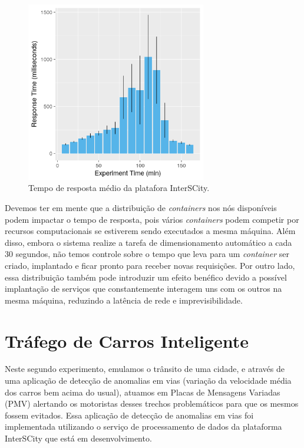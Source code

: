 \begin{figure}[ht]
	\centering
	\includegraphics[width=0.7\textwidth]{figuras/response_time_mean.png}
    \caption{Tempo de resposta médio da platafora InterSCity.}
	\label{fig:responsetime}
\end{figure}


Devemos ter em mente que a distribuição de \textit{containers} nos nós disponíveis podem impactar o tempo de resposta, pois vários \textit{containers} podem competir por recursos computacionais se estiverem
sendo executados a mesma máquina.
Além disso, embora o sistema realize a tarefa de dimensionamento automático a cada 30 segundos, não temos controle sobre o tempo que leva para um \textit{container} ser criado, implantado e ficar pronto
para receber novas requisições.
Por outro lado, essa distribuição também pode introduzir um efeito benéfico devido a possível implantação de serviços que constantemente interagem uns com os outros na mesma máquina, reduzindo a latência
de rede e imprevisibilidade.

\section{Tráfego de Carros Inteligente}

Neste segundo experimento, emulamos o trânsito de uma cidade, e através de uma aplicação de detecção de anomalias em vias (variação da velocidade média dos carros bem acima do usual),
atuamos em Placas de Mensagens Variadas (PMV) alertando os motoristas desses trechos problemáticos para que os mesmos fossem evitados.
Essa aplicação de detecção de anomalias em vias foi implementada utilizando o serviço de processamento de dados da plataforma InterSCity que está em desenvolvimento.

